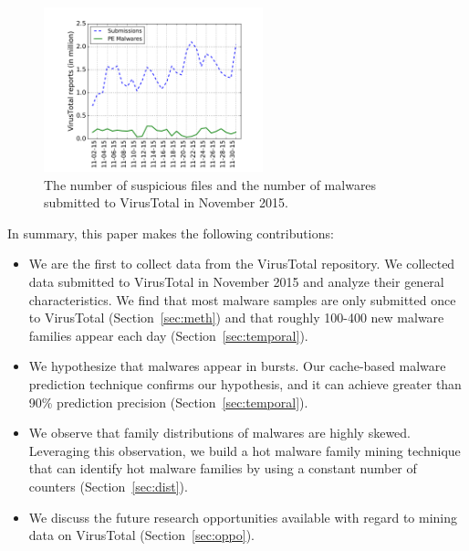 \begin{figure}[t!]
\begin{center}
\includegraphics[width=2.5in]{figure/nov}
\caption{The number of suspicious files and the number of malwares submitted to VirusTotal in November 2015. }
\label{fig:subnum}
\end{center}
\end{figure}

In summary, this paper makes the following contributions:

\begin{itemize}

\item We are the first to collect data from the VirusTotal repository.
We collected data submitted to VirusTotal in November 2015 
and analyze their general characteristics. 
We find that most malware samples are only submitted once to VirusTotal (Section~\ref{sec:meth}) 
and that roughly 100-400 new malware families appear each day (Section~\ref{sec:temporal}). 


\item We hypothesize that malwares appear in bursts. 
Our cache-based malware prediction technique confirms our hypothesis, 
and it can achieve greater than 90\% prediction precision (Section~\ref{sec:temporal}). 

\item We observe that family distributions of malwares are highly skewed. 
Leveraging this observation, we build a hot malware family mining technique that can identify hot 
malware families by using a constant number of counters (Section~\ref{sec:dist}).

\item We discuss the future research opportunities available with regard to mining data on VirusTotal (Section~\ref{sec:oppo}). 

\end{itemize}


